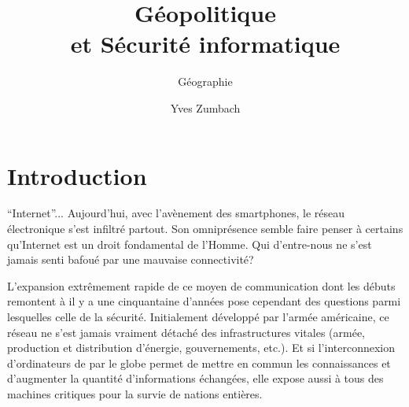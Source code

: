 \documentclass[article, french]{yReport}
\author{Yves Zumbach}
\subtitle{Géographie}
\title{Géopolitique\\et Sécurité informatique}
\begin{document}
	
	\startcontents
	\printMarginPartialToc[1][En Bref]
	
	\section{Introduction}
	\enquote{Internet}...
	Aujourd'hui, avec l'avènement des smartphones, le réseau électronique s'est infiltré partout.
	Son omniprésence semble faire penser à certains qu'Internet est un droit fondamental de l'Homme.
	Qui d'entre-nous ne s'est jamais senti bafoué par une mauvaise connectivité?
	
	L'expansion extrêmement rapide de ce moyen de communication dont les débuts remontent à il y a une cinquantaine d'années%
	pose cependant des questions parmi lesquelles celle de la sécurité.
	Initialement développé par l'armée américaine, ce réseau ne s'est jamais vraiment détaché des infrastructures vitales (armée, production et distribution d'énergie, gouvernements, etc.).
	Et si l'interconnexion d'ordinateurs de par le globe permet de mettre en commun les connaissances et d'augmenter la quantité d'informations échangées, elle expose aussi à tous des machines critiques pour la survie de nations entières.
	
\end{document}
